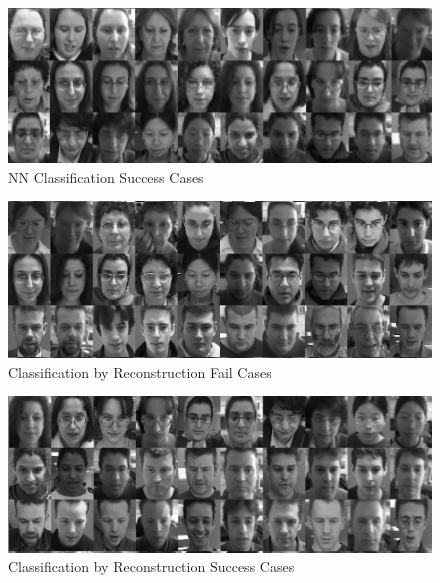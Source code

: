 \documentclass[10pt,technote]{IEEEtran}
\begin{document}
\begin{figure}[htb!]
    \centering
    \includegraphics[width=\linewidth]{../results/1bb/NN_SUCCESS2_cropped.png}
    \caption{NN Classification Success Cases}
    \label{fig:nn_successes}
\end{figure}

\begin{figure}[htb!]
    \centering
    \includegraphics[width=\linewidth]{../results/1bb/REC_FAIL2_cropped.png}
    \caption{Classification by Reconstruction Fail Cases}
    \label{fig:rec_fails}
\end{figure}

\begin{figure}[htb!]
    \centering
    \includegraphics[width=\linewidth]{../results/1bb/REC_SUCCESS2_cropped.png}
    \caption{Classification by Reconstruction Success Cases}
    \label{fig:rec_successes}
\end{figure}
\end{document}
